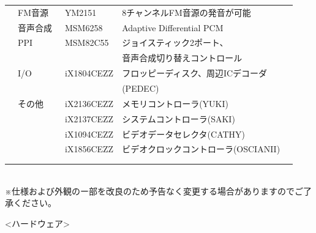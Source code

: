 \documentclass[twoside,a4paper,12pt]{article}
\begin{document}
\begin{tabular}{|p{13mm}|p{25mm}|p{22mm}|p{73mm}|p{30mm}|}
& FM音源 & \ YM2151 & 8チャンネルFM音源の発音が可能 &\\
& 音声合成 & \ MSM6258 & Adaptive Differential PCM &\\
& PPI & \ MSM82C55 & ジョイスティック2ポート、 &\\
& & & 音声合成切り替えコントロール &\\
& I/O & \ iX1804CEZZ & フロッピーディスク、周辺ICデコーダ &\\
& & & (PEDEC) &\\
& その他 & \ iX2136CEZZ & メモリコントローラ(YUKI) &\\
& & \ iX2137CEZZ & システムコントローラ(SAKI) &\\
& & \ iX1094CEZZ & ビデオデータセレクタ(CATHY) &\\
& & \ iX1856CEZZ & ビデオクロックコントローラ(OSCIANII) &\\
& & & &\\
& & & &\\
\hline
\end{tabular}\\

※仕様および外観のー部を改良のため予告なく変更する場合がありますのでご了承ください。

\newpage

<ハードウェア>
\end{document}
